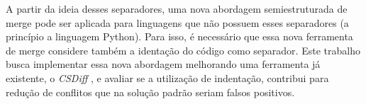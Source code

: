 A partir da ideia desses separadores, uma nova abordagem semiestruturada de merge pode ser aplicada para linguagens que não possuem esses separadores (a princípio a linguagem Python). Para isso, é necessário que essa nova ferramenta de merge considere também a identação do código como separador. Este trabalho busca implementar essa nova abordagem melhorando uma ferramenta já existente, o \emph{CSDiff} \cite{clementino2021textual}, e avaliar se a utilização de indentação, contribui para redução de conflitos que na solução padrão seriam falsos positivos.
